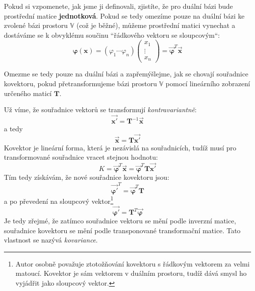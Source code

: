 \documentclass[a5paper,12pt]{amsbook}
\theoremstyle{definition}
\newcommand{\myvec}[1]{\mathbf{#1}}
\newcommand{\mycoord}[1]{\overrightarrow{\mathbf{#1}}}
\newcommand{\mymatrix}[1]{\mathbf{#1}}
\newcommand{\myspace}[1]{\mathbb{#1}}
\begin{document}
Pokud si vzpomenete, jak jsme ji definovali, zjistíte, že pro duální bázi bude
prostřední matice \textbf{jednotková}. Pokud se tedy omezíme pouze na duální
bázi ke zvolené bázi prostoru $\myspace{V}$ (což je běžné), můžeme prostřední
matici vynechat a dostáváme se k obvyklému součinu ``řádkového vektoru se
sloupcovým``:
\begin{equation*}
\myvec{\varphi}(\myvec{x}) = \left(\varphi_1 \cdots \varphi_n\right)
\left(\begin{array}{c}x_1 \\ \vdots \\ x_n\end{array}\right)
= \mycoord{\varphi}^T\mycoord{x}
\end{equation*}

\medskip\noindent
Omezme se tedy pouze na duální bázi a zapřemýšlejme, jak se chovají souřadnice
kovektoru, pokud přetransformujeme bázi prostoru $\myspace{V}$ pomocí lineárního
zobrazení určeného maticí $\mymatrix{T}$.

Už víme, že souřadnice vektorů se transformují \textit{kontravariantně}:
\begin{equation*}
\mycoord{x'} = \mymatrix{T}^{-1}\mycoord{x}
\end{equation*}
a tedy
\begin{equation*}
\mycoord{x} = \mymatrix{T}\mycoord{x'}
\end{equation*}
Kovektor je lineární forma, která je nezávislá na souřadnicích, tudíž musí pro
transformované souřadnice vracet stejnou hodnotu:
\begin{equation*}
K = \mycoord{\varphi}^T\mycoord{x} = \mycoord{\varphi}^T\mymatrix{T}\mycoord{x'}
\end{equation*}
Tím tedy získávám, že nové souřadnice kovektoru jsou:
\begin{equation*}
\mycoord{\varphi'}^T = \mycoord{\varphi}^T\mymatrix{T}
\end{equation*}
a po převedení na sloupcový vektor\footnote{
  Autor osobně považuje ztotožňování kovektoru s řádkovým vektorem za velmi matoucí.
  Kovektor je sám vektorem v duálním prostoru, tudíž dává smysl ho vyjádřit
  jako sloupcový vektor.}
\begin{equation*}
\mycoord{\varphi'} = \mymatrix{T}^T\mycoord{\varphi}
\end{equation*}
Je tedy zřejmé, že zatímco souřadnice vektoru se mění podle inverzní matice, souřadnice
kovektoru se mění podle transponované transformační matice. Tato vlastnost se nazývá
\textit{kovariance}.
\end{document}
